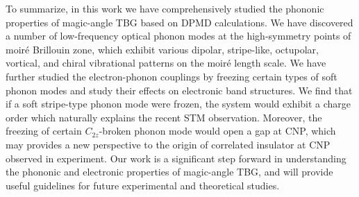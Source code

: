 \documentclass[aps,prl,twocolumn,amsmath,amssymb]{revtex4-2}
\begin{document}
To summarize, in this work we have comprehensively studied the phononic properties of magic-angle TBG based on DPMD calculations. We have discovered a number of low-frequency  optical phonon modes at the high-symmetry points of moir\'e Brillouin zone, which exhibit various dipolar, stripe-like, octupolar, vortical, and chiral vibrational patterns on the moir\'e length scale. We have further studied the electron-phonon couplings by freezing certain types of soft phonon modes and study their effects on electronic band structures. We find that if a soft stripe-type phonon mode were frozen,  the system would exhibit a charge order which naturally explains the recent STM observation. Moreover,  the freezing of certain $C_{2z}$-broken phonon mode would open a gap at CNP, which may provides a new perspective to the origin of correlated insulator at CNP observed in experiment. Our work is a significant step forward in understanding the phononic and electronic properties of magic-angle TBG, and will provide useful guidelines for future experimental and theoretical studies.


\end{document}
